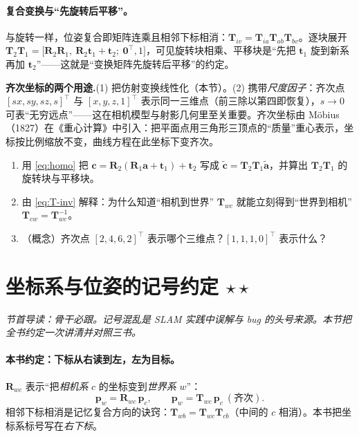 \paragraph{复合变换与“先旋转后平移”。}与旋转一样，位姿复合即矩阵连乘且相邻下标相消：$\mathbf{T}_{iv}=\mathbf{T}_{ia}\mathbf{T}_{ab}\mathbf{T}_{bv}$。逐块展开 $\mathbf{T}_2\mathbf{T}_1=\big[\mathbf{R}_2\mathbf{R}_1,\ \mathbf{R}_2\mathbf{t}_1+\mathbf{t}_2;\ \mathbf{0}^\top,1\big]$，可见旋转块相乘、平移块是“先把 $\mathbf{t}_1$ 旋到新系再加 $\mathbf{t}_2$”——这就是“变换矩阵先旋转后平移”的约定\cite{barfoot2024state}。

\begin{note}
\textbf{齐次坐标的两个用途.}\;(1) 把仿射变换线性化（本节）。(2) 携带\emph{尺度因子}：齐次点 $[sx,sy,sz,s]^\top$ 与 $[x,y,z,1]^\top$ 表示同一三维点（前三除以第四即恢复），$s\to0$ 可表“无穷远点”——这在相机模型与射影几何里至关重要。齐次坐标由 Möbius（1827）在《重心计算》中引入：把平面点用三角形三顶点的“质量”重心表示，坐标按比例缩放不变，曲线方程在此坐标下变齐次\cite{barfoot2024state}。
\end{note}

\begin{practice}
\begin{enumerate}
  \item 用 \cref{eq:homo} 把 $\mathbf{c}=\mathbf{R}_2(\mathbf{R}_1\mathbf{a}+\mathbf{t}_1)+\mathbf{t}_2$ 写成 $\tilde{\mathbf{c}}=\mathbf{T}_2\mathbf{T}_1\tilde{\mathbf{a}}$，并算出 $\mathbf{T}_2\mathbf{T}_1$ 的旋转块与平移块。
  \item 由 \cref{eq:T-inv} 解释：为什么知道“相机到世界” $\mathbf{T}_{wc}$ 就能立刻得到“世界到相机” $\mathbf{T}_{cw}=\mathbf{T}_{wc}^{-1}$。
  \item （概念）齐次点 $[2,4,6,2]^\top$ 表示哪个三维点？$[1,1,1,0]^\top$ 表示什么？
\end{enumerate}
\end{practice}

\section{坐标系与位姿的记号约定 \texorpdfstring{$\star\star$}{**}}
\label{sec:rb-convention}
\noindent\emph{节首导读：骨干必跟。记号混乱是 SLAM 实践中误解与 bug 的头号来源\cite{barfoot2024state}。本节把全书约定一次讲清并对照三书。}

\paragraph{本书约定：下标从右读到左，左为目标。}
$\mathbf{R}_{wc}$ 表示“把\emph{相机系} $c$ 的坐标变到\emph{世界系} $w$”：
\begin{equation}
  \mathbf{p}_w=\mathbf{R}_{wc}\,\mathbf{p}_c,\qquad \mathbf{p}_w=\mathbf{T}_{wc}\,\mathbf{p}_c\ (\text{齐次}).
\end{equation}
相邻下标相消是记忆复合方向的诀窍：$\mathbf{T}_{wb}=\mathbf{T}_{wc}\mathbf{T}_{cb}$（中间的 $c$ 相消）。本书把坐标系标号写在\emph{右下标}。

